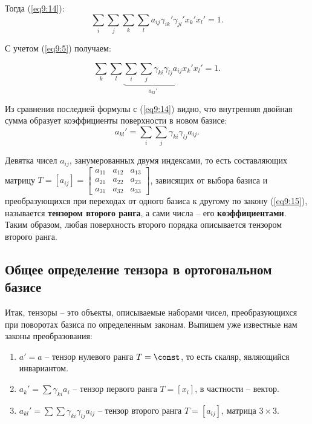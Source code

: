 	Тогда (\ref{eq9:14}):
	\[ \sum\limits_i\sum\limits_j\sum\limits_k\sum\limits_l a_{ij}\gamma_{ik}'\gamma_{jl}' x_k' x_l' = 1. \]
	
	С учетом (\ref{eq9:5}) получаем:
	
	\[ \sum\limits_k\sum\limits_l \underbrace{\sum\limits_i\sum\limits_j \gamma_{ki}\gamma_{lj}a_{ij}}_{a_{kl}'} x_k' x_l' = 1. \]
	
	Из сравнения последней формулы с (\ref{eq9:14}) видно, что внутренняя двойная сумма образует коэффициенты поверхности в новом базисе:
	\begin{equation}
		a_{kl}' = \sum\limits_i\sum\limits_j \gamma_{ki}\gamma_{lj}a_{ij}. \label{eq9:15}
	\end{equation}
	
	\begin{definition}
	Девятка чисел \( a_{ij} \), занумерованных двумя индексами, то есть составляющих матрицу \( T = [a_{ij}] = \left[ \begin{smallmatrix} a_{11} & a_{12} & a_{13} \\ a_{21} & a_{22} & a_{23} \\ a_{31} & a_{32} & a_{33} \end{smallmatrix} \right] \), зависящих от выбора базиса и преобразующихся при переходах от одного базиса к другому по закону (\ref{eq9:15}), называется \textbf{тензором второго ранга}, а сами числа -- его \textbf{коэффициентами}. Таким образом, любая поверхность второго порядка описывается тензором второго ранга.
	\end{definition}
	
\subsection{Общее определение тензора в ортогональном базисе}

	Итак, тензоры -- это объекты, описываемые наборами чисел, преобразующихся при поворотах базиса по определенным законам. Выпишем уже известные нам законы преобразования:
	\begin{enumerate}
		\item \( a' = a \) -- тензор нулевого ранга \( T = \const \), то есть скаляр, являющийся инвариантом.
		\item \( a_k' = \sum \gamma_{ki}a_i \) -- тензор первого ранга \(T = [x_i] \), в частности -- вектор.
		\item \( a_{kl}' = \sum\sum \gamma_{ki}\gamma_{lj}a_{ij} \) -- тензор второго ранга \( T = [a_{ij}] \), матрица \( 3 \times 3 \).
	\end{enumerate}
	

